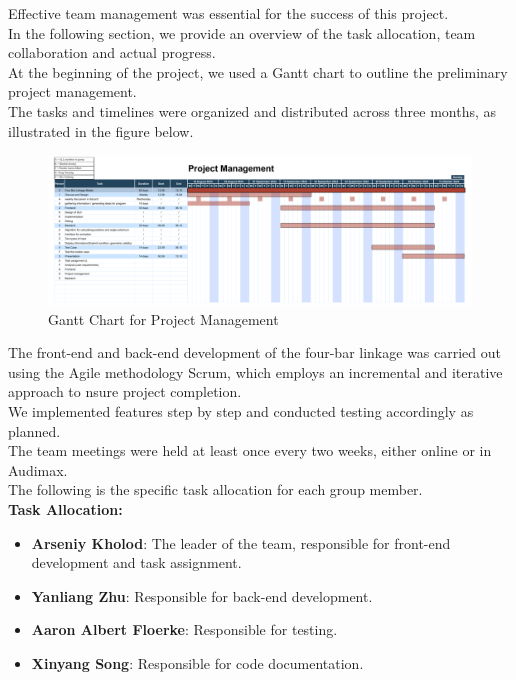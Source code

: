 \documentclass{article}
\begin{document}
Effective team management was essential for the success of this project.\\
In the following section, we provide an overview of the task allocation, team collaboration and actual progress.\\
At the beginning of the project, we used a Gantt chart to outline the preliminary project management.\\
The tasks and timelines were organized and distributed across three months, as illustrated in the figure below.

\begin{figure}[h]
	\centering
	\includegraphics[width=\textwidth]{./figures/project_management_gantt_chart.pdf}
	\caption{Gantt Chart for Project Management}
	\label{fig:project_management_gantt_chart}
\end{figure}

The front-end and back-end development of the four-bar linkage was carried out using the Agile methodology Scrum, which employs an incremental and iterative approach to nsure project completion.\\
We implemented features step by step and conducted testing accordingly as planned.\\
The team meetings were held at least once every two weeks, either online or in Audimax.\\
The following is the specific task allocation for each group member.\\

\textbf{Task Allocation:}
\begin{itemize}
    \item \textbf{Arseniy Kholod}: The leader of the team, responsible for front-end development and task assignment.
    \item \textbf{Yanliang Zhu}: Responsible for back-end development.
    \item \textbf{Aaron Albert Floerke}: Responsible for testing.
    \item \textbf{Xinyang Song}: Responsible for code documentation.
\end{itemize}
\end{document}

